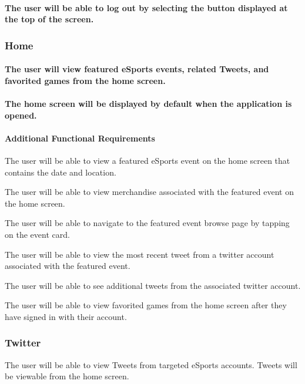 \documentclass[onecolumn, draftclsnofoot,10pt, compsoc]{IEEEtran}
\begin{document}
\paragraph{The user will be able to log out by selecting the button displayed at the top of the screen.}

\subsubsection{Home}
\paragraph{The user will view featured eSports events, related Tweets, and favorited games from the home screen.}
\paragraph{The home screen will be displayed by default when the application is opened.}
\begin{itemize}
\paragraph{Additional Functional Requirements}
{\setlength\itemindent{50pt} \item The user will be able to view a featured eSports event on the home screen that contains the date and location.}
{\setlength\itemindent{50pt} \item The user will be able to view merchandise associated with the featured event on the home screen.}
{\setlength\itemindent{50pt} \item The user will be able to navigate to the featured event browse page by tapping on the event card.}
{\setlength\itemindent{50pt} \item The user will be able to view the most recent tweet from a twitter account associated with the featured event.}
{\setlength\itemindent{50pt} \item The user will be able to see additional tweets from the associated twitter account.}
{\setlength\itemindent{50pt} \item The user will be able to view favorited games from the home screen after they have signed in with their account.}
\end{itemize}

\subsubsection{Twitter}
{\setlength\itemindent{50pt} The user will be able to view Tweets from targeted eSports accounts.}
{\setlength\itemindent{50pt} Tweets will be viewable from the home screen.}
\end{document}
